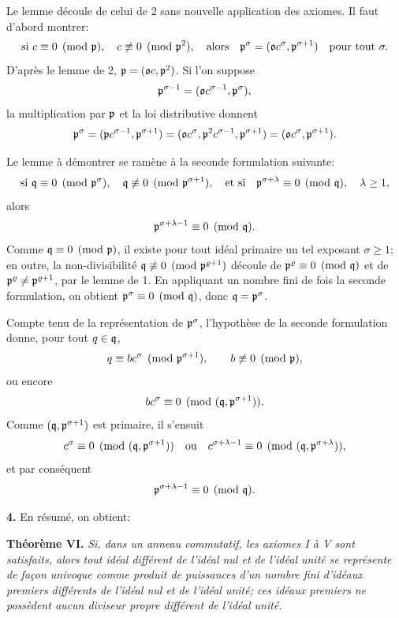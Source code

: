 Le lemme découle de celui de 2 sans nouvelle application des axiomes. Il faut d'abord montrer:
\[
\text{si }c\equiv0\pmod{\mathfrak{p}},\quad
c\not\equiv0\pmod{\mathfrak{p}^2},
\quad\text{alors}\quad
\mathfrak{p}^\sigma=(\mathfrak{o} c^\sigma,\mathfrak{p}^{\sigma+1})
\quad\text{pour tout }\sigma.
\]
D'après le lemme de 2, $\mathfrak{p}=(\mathfrak{o} c,\mathfrak{p}^2)$. Si l'on suppose
\[
\mathfrak{p}^{\sigma-1}=(\mathfrak{o} c^{\sigma-1},\mathfrak{p}^\sigma),
\]
la multiplication par $\mathfrak{p}$ et la loi distributive donnent
\[
\mathfrak{p}^\sigma
=(\mathfrak{p} c^{\sigma-1},\mathfrak{p}^{\sigma+1})
=(\mathfrak{o} c^\sigma,\mathfrak{p}^2c^{\sigma-1},\mathfrak{p}^{\sigma+1})
=(\mathfrak{o} c^\sigma,\mathfrak{p}^{\sigma+1}).
\]

Le lemme à démontrer se ramène à la seconde formulation suivante:
\[
\text{si }\mathfrak{q}\equiv0\pmod{\mathfrak{p}^\sigma},\quad
\mathfrak{q}\not\equiv0\pmod{\mathfrak{p}^{\sigma+1}},
\quad\text{et si}\quad
\mathfrak{p}^{\sigma+\lambda}\equiv0\pmod{\mathfrak{q}},
\quad \lambda\ge1,
\]
alors
\[
\mathfrak{p}^{\sigma+\lambda-1}\equiv0\pmod{\mathfrak{q}}.
\]
Comme $\mathfrak{q}\equiv0\pmod{\mathfrak{p}}$, il existe pour tout idéal primaire un tel exposant $\sigma\ge1$; en outre, la non-divisibilité
$\mathfrak{q}\not\equiv0\pmod{\mathfrak{p}^{\varrho+1}}$ découle de
$\mathfrak{p}^\varrho\equiv0\pmod{\mathfrak{q}}$ et de
$\mathfrak{p}^\varrho\ne\mathfrak{p}^{\varrho+1}$, par le lemme de 1. En appliquant un nombre fini de fois la seconde formulation, on obtient
$\mathfrak{p}^\sigma\equiv0\pmod{\mathfrak{q}}$, donc $\mathfrak{q}=\mathfrak{p}^\sigma$.

Compte tenu de la représentation de $\mathfrak{p}^\sigma$, l'hypothèse de la seconde formulation donne, pour tout $q\in\mathfrak{q}$,
\[
q\equiv bc^\sigma\pmod{\mathfrak{p}^{\sigma+1}},
\qquad b\not\equiv0\pmod{\mathfrak{p}},
\]
ou encore
\[
bc^\sigma\equiv0\pmod{(\mathfrak{q},\mathfrak{p}^{\sigma+1})}.
\]
Comme $(\mathfrak{q},\mathfrak{p}^{\sigma+1})$ est primaire, il s'ensuit
\[
c^\sigma\equiv0\pmod{(\mathfrak{q},\mathfrak{p}^{\sigma+1})}
\quad\text{ou}\quad
c^{\sigma+\lambda-1}\equiv0\pmod{(\mathfrak{q},\mathfrak{p}^{\sigma+\lambda})},
\]
et par conséquent
\[
\mathfrak{p}^{\sigma+\lambda-1}\equiv0\pmod{\mathfrak{q}}.
\]

\textbf{4.} En résumé, on obtient:

\textbf{Théorème VI.} \emph{Si, dans un anneau commutatif, les axiomes I à V sont satisfaits, alors tout idéal différent de l'idéal nul et de l'idéal unité se représente de façon univoque comme produit de puissances d'un nombre fini d'idéaux premiers différents de l'idéal nul et de l'idéal unité; ces idéaux premiers ne possèdent aucun diviseur propre différent de l'idéal unité.}
